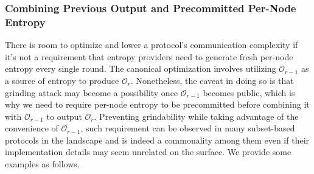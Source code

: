 \documentclass[letterpaper,twocolumn,10pt]{article}
\theoremstyle{definition}
\theoremstyle{remark}
\begin{document}
\subsubsection{Combining Previous Output and Precommitted Per-Node Entropy}
\label{subsubsection:precommitted}
There is room to optimize and lower a protocol's communication complexity if it's not a requirement that entropy providers need to generate fresh per-node entropy every single round. The canonical optimization involves utilizing $\mathcal{O}_{r - 1}$ as a source of entropy to produce $\mathcal{O}_{r}$. Nonetheless, the caveat in doing so is that grinding attack may become a possibility once $\mathcal{O}_{r - 1}$ becomes public, which is why we need to require per-node entropy to be precommitted before combining it with $\mathcal{O}_{r - 1}$ to output $\mathcal{O}_r$. Preventing grindability while taking advantage of the convenience of $\mathcal{O}_{r - 1}$, such requirement can be observed in many subset-based protocols in the landscape and is indeed a commonality among them even if their implementation details may seem unrelated on the surface. We provide some examples as follows.
\end{document}
